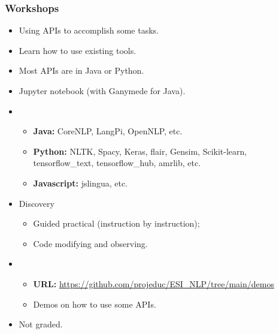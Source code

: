 \documentclass{beamer}
\begin{document}
\begin{frame}
	\frametitle{Workshops}
	
	\begin{itemize}
		\item Using APIs to accomplish some tasks.
		\item {} Learn how to use existing tools.
		\item {} Most APIs are in Java or Python.
		\item {} Jupyter notebook (with Ganymede for Java).
		\item {} 
		\begin{itemize}
			\item \textbf{Java:} CoreNLP, LangPi, OpenNLP, etc.
			\item \textbf{Python:} NLTK, Spacy, Keras, flair, Gensim, Scikit-learn, tensorflow\_text, tensorflow\_hub, amrlib, etc.
			\item \textbf{Javascript:} jslingua, etc.
		\end{itemize}
		\item {} Discovery
		\begin{itemize}
			\item Guided practical (instruction by instruction); 
			\item Code modifying and observing.
		\end{itemize}
		\item {}
		\begin{itemize}
			\item \textbf{URL:} {\scriptsize\url{https://github.com/projeduc/ESI_NLP/tree/main/demos}}
			\item Demos on how to use some APIs.
		\end{itemize}
		\item Not graded.
	\end{itemize}
	
\end{frame}
\end{document}
